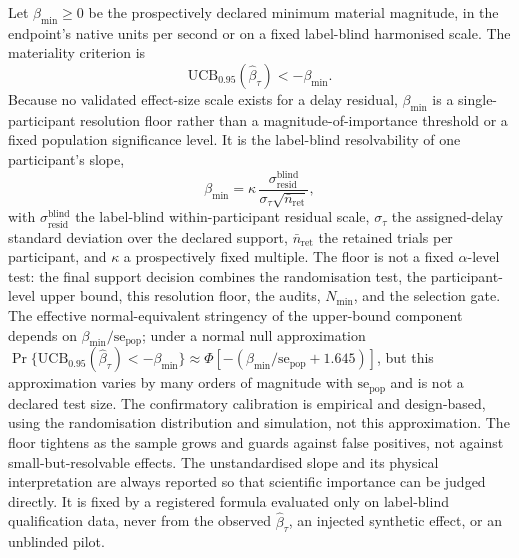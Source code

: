 \documentclass[11pt,a4paper]{article}
\theoremstyle{definition}
\newcommand{\UCB}{\mathrm{UCB}_{0.95}}
\begin{document}
Let \(\beta_{\min}\geq0\) be the prospectively declared minimum material
magnitude, in the endpoint's native units per second or on a fixed label-blind
harmonised scale. The materiality criterion is
\begin{equation}
\label{eq:materiality}
\UCB\!\left(\widehat{\beta}_\tau\right)<-\beta_{\min}.
\end{equation}
Because no validated effect-size scale exists for a delay residual,
\(\beta_{\min}\) is a single-participant resolution floor rather than a
magnitude-of-importance threshold or a fixed population significance level. It is
the label-blind resolvability of one participant's slope,
\begin{equation}
\label{eq:beta-min-main}
\beta_{\min}=\kappa\,\frac{\sigma^{\mathrm{blind}}_{\mathrm{resid}}}
{\sigma_\tau\sqrt{\bar n_{\mathrm{ret}}}},
\end{equation}
with \(\sigma^{\mathrm{blind}}_{\mathrm{resid}}\) the label-blind within-participant
residual scale, \(\sigma_\tau\) the assigned-delay standard deviation over the
declared support, \(\bar n_{\mathrm{ret}}\) the retained trials per participant, and
\(\kappa\) a prospectively fixed multiple. The floor is not a fixed
\(\alpha\)-level test: the final support decision combines the randomisation test,
the participant-level upper bound, this resolution floor, the audits,
\(N_{\min}\), and the selection gate. The effective normal-equivalent stringency of
the upper-bound component depends on \(\beta_{\min}/\mathrm{se}_{\mathrm{pop}}\);
under a normal null approximation
\(\Pr\{\UCB(\widehat{\beta}_\tau)<-\beta_{\min}\}\approx
\Phi[-(\beta_{\min}/\mathrm{se}_{\mathrm{pop}}+1.645)]\), but this approximation
varies by many orders of magnitude with \(\mathrm{se}_{\mathrm{pop}}\) and is not a
declared test size. The confirmatory calibration is empirical and design-based,
using the randomisation distribution and simulation, not this approximation. The
floor tightens as the sample grows and guards against false positives, not against
small-but-resolvable effects. The unstandardised slope and its physical
interpretation are always reported so that scientific importance can be judged
directly. It is fixed by a registered formula evaluated only on label-blind
qualification data, never from the observed \(\widehat{\beta}_\tau\), an injected
synthetic effect, or an unblinded pilot.
\end{document}

